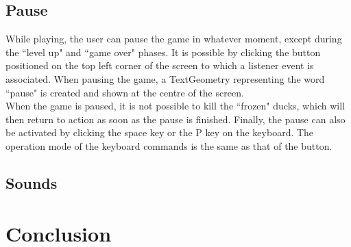 \documentclass[12pt,a4paper]{article}
\begin{document}
	\subsection{Pause}
	While playing, the user can pause the game in whatever moment, except during the ``level up" and ``game over" phases.
	It is possible by clicking the button positioned on the top left corner of the screen to which a listener event is associated.
	When pausing the game, a TextGeometry representing the word ``pause" is created and shown at the centre of the screen.\\
	When the game is paused, it is not possible to kill the ``frozen" ducks, which will then return to action as soon as the pause is finished.
	Finally, the pause can also be activated by clicking the space key or the P key on the keyboard. The operation mode of the keyboard commands is the same as that of the button.
	\subsection{Sounds}
	
	
	\section{Conclusion}
	
	
\end{document}
